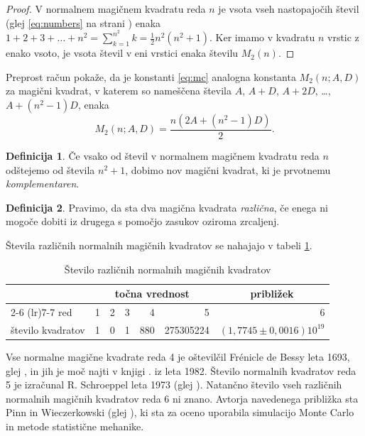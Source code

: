 \documentclass[a4paper,12pt]{article}
\theoremstyle{definition}
\newtheorem{definicija}{Definicija}
\theoremstyle{plain}
\begin{document}
   \begin{proof}
   V normalnem magičnem kvadratu reda \(n\) je vsota vseh nastopajočih
   števil (glej \eqref{eq:numbers} na strani \pageref{eq:numbers}) enaka
   \(1+2+3+\ldots+n^2 = \sum_{k=1}^{n^2} k = \frac{1}{2}n^2(n^2+1)\).
   Ker imamo v kvadratu \(n\) vrstic z enako vsoto, je vsota števil v eni vrstici
   enaka številu \(M_2(n)\).
   \end{proof}

Preprost račun pokaže, da je konstanti \eqref{eq:mc} analogna konstanta
\(M_2(n;A,D)\) za magični kvadrat, v katerem so nameščena števila
\(A\), \(A+D\), \(A+2D\), \ldots, \(A+(n^2-1)D\), enaka
\[ M_2(n;A,D) = \frac{n(2A + (n^2-1)D)}{2}. \]

 \begin{definicija}
      Če vsako od števil v normalnem magičnem kvadratu reda \(n\) odštejemo
      od števila \(n^2+1\), dobimo nov magični kvadrat, ki je prvotnemu
      \emph{komplementaren}.
 \end{definicija}

 \begin{definicija}
      Pravimo, da sta dva magična kvadrata \emph{različna}, če enega ni mogoče dobiti
      iz drugega s pomočjo zasukov oziroma zrcaljenj.
 \end{definicija}

Števila različnih normalnih magičnih kvadratov se nahajajo v tabeli \ref{table:stevila}.

\begin{table}[h]
   \centering
   \caption{Število različnih normalnih magičnih kvadratov}
   \label{table:stevila}
   \begin{tabular}{lrrrrrr}
      \toprule
      & \multicolumn{5}{c}{točna vrednost} & \multicolumn{1}{c}{približek} \\
      \cmidrule(lr){2-6} \cmidrule(lr){7-7}
      red & 1 & 2 & 3 & 4 & 5 & 6 \\
      število kvadratov & 1 & 0 & 1 & 880 & 275305224 & \((1{,}7745 \pm 0{,}0016)10^{19}\) \\
      \bottomrule
   \end{tabular}
\end{table}
Vse normalne magične kvadrate reda 4 je oštevilčil Frénicle de Bessy
leta 1693, glej \cite{bessy}, in jih je moč najti v knjigi \cite{berlekamp}.
iz leta 1982. Število normalnih kvadratov reda 5 je izračunal
R. Schroeppel leta 1973 (glej \cite{gardner}).
Natančno število vseh različnih normalnih magičnih kvadratov reda 6 ni znano.
Avtorja navedenega približka sta Pinn in Wieczerkowski (glej \cite{pinn}), ki
sta za oceno uporabila simulacijo Monte Carlo in metode statistične mehanike.


\newpage




\end{document}
